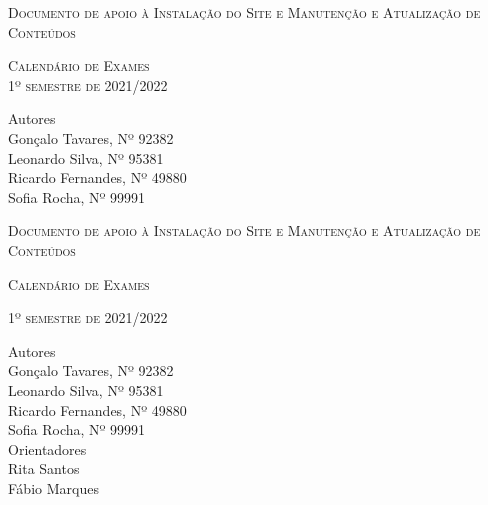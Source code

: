 \documentclass[11pt, twoside]{report}
\begin{document}
	
	\onehalfspacing %
	
	
	\begin{titlepage}
		\centering
		\scshape\Huge Documento de apoio à Instalação do Site e Manutenção e Atualização de Conteúdos\par
		\vspace{0.9cm}
		
		\scshape\large  Calendário de Exames\\
		\vspace{0.3cm}
		\scshape\large 1º semestre de 2021/2022\par
		\vspace{0.4cm}
		\centering
		
		\vspace{1cm}
		
		\large
		Autores\\
		Gonçalo Tavares, Nº 92382  \\
		Leonardo Silva, Nº 95381 \\
		Ricardo Fernandes, Nº 49880 \\
		Sofia Rocha, Nº 99991 \\
		
		\vspace{1cm}
		
		\centering
		
		\newpage
		\thispagestyle{plain}%
		\thispagestyle{empty}%
		\centering
		\scshape\Huge  Documento de apoio à Instalação do Site e Manutenção e Atualização de Conteúdos \par
		\vspace{1cm}
		
		\scshape\large Calendário de Exames\par
		\vspace{1cm}
		\scshape\large 1º semestre de 2021/2022\par
		\vspace{4cm}
		
		
		
		\large
		Autores\\
		Gonçalo Tavares, Nº 92382  \\
		Leonardo Silva, Nº 95381 \\
		Ricardo Fernandes, Nº 49880  \\
		Sofia Rocha, Nº 99991 \\
		
		\vspace{1cm}
		Orientadores\\
		Rita Santos \\
		Fábio Marques\\
		\vspace{4cm}
		
		\centering
		
	\end{titlepage}
	
\end{document}
